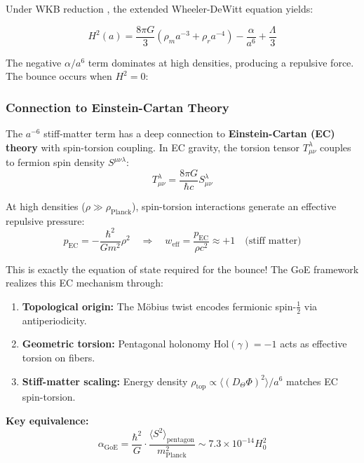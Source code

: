 \documentclass[12pt]{article}
\begin{document}
Under WKB reduction \cite{barroso2024,demetrio2023,pinto2020}, the extended Wheeler-DeWitt equation yields:

\begin{equation}
H^2(a) = \frac{8\pi G}{3}\left(\rho_m a^{-3} + \rho_r a^{-4}\right) - \frac{\alpha}{a^6} + \frac{\Lambda}{3}
\end{equation}

The negative $\alpha/a^6$ term dominates at high densities, producing a repulsive force. The bounce occurs when $H^2 = 0$:

\subsubsection{Connection to Einstein-Cartan Theory}

The $a^{-6}$ stiff-matter term has a deep connection to \textbf{Einstein-Cartan (EC) theory} with spin-torsion coupling. In EC gravity, the torsion tensor $T^\lambda_{\mu\nu}$ couples to fermion spin density $S^{\mu\nu\lambda}$:
\begin{equation}
T^\lambda_{\mu\nu} = \frac{8\pi G}{\hbar c} S^{\lambda}_{\mu\nu}
\end{equation}

At high densities ($\rho \gg \rho_{\text{Planck}}$), spin-torsion interactions generate an effective repulsive pressure:
\begin{equation}
p_{\text{EC}} = -\frac{\hbar^2}{G m^2} \rho^2 \quad \Rightarrow \quad w_{\text{eff}} = \frac{p_{\text{EC}}}{\rho c^2} \approx +1 \quad \text{(stiff matter)}
\end{equation}

This is exactly the equation of state required for the bounce! The GoE framework realizes this EC mechanism through:
\begin{enumerate}
\item \textbf{Topological origin:} The M\"obius twist encodes fermionic spin-$\tfrac{1}{2}$ via antiperiodicity.
\item \textbf{Geometric torsion:} Pentagonal holonomy $\text{Hol}(\gamma) = -1$ acts as effective torsion on fibers.
\item \textbf{Stiff-matter scaling:} Energy density $\rho_{\text{top}} \propto \langle (D_\Theta \Phi)^2 \rangle / a^6$ matches EC spin-torsion.
\end{enumerate}

\textbf{Key equivalence:}
\begin{equation}
\boxed{\alpha_{\text{GoE}} = \frac{\hbar^2}{G} \cdot \frac{\langle S^2 \rangle_{\text{pentagon}}}{m_{\text{Planck}}^2} \sim 7.3 \times 10^{-14} H_0^2}
\end{equation}
\end{document}
